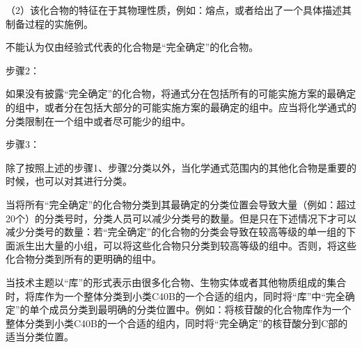 {\setlength{\parindent}{17.1bp}（2）该化合物的特征在于其物理性质，例如：熔点，或者给出了一个具体描述其制备过程的实施例。\par}

不能认为仅由经验式代表的化合物是“完全确定”的化合物。

{\kaiti 步骤2：}

如果没有披露“完全确定”的化合物，将通式分在包括所有的可能实施方案的最确定的组中，或者分在包括大部分的可能实施方案的最确定的组中。应当将化学通式的分类限制在一个组中或者尽可能少的组中。

{\kaiti 步骤3：}

除了按照上述的步骤1、步骤2分类以外，当化学通式范围内的其他化合物是重要的时候，也可以对其进行分类。

当将所有“完全确定”的化合物分类到其最确定的分类位置会导致大量（例如：超过20个）的分类号时，分类人员可以减少分类号的数量。但是只在下述情况下才可以减少分类号的数量：若“完全确定”的化合物的分类会导致在较高等级的单一组的下面派生出大量的小组，可以将这些化合物只分类到较高等级的组中。否则，将这些化合物分类到所有的更明确的组中。

当技术主题以“库”的形式表示由很多化合物、生物实体或者其他物质组成的集合时，将库作为一个整体分类到小类C40B的一个合适的组内，同时将“库”中“完全确定”的单个成员分类到最明确的分类位置中。例如：将核苷酸的化合物库作为一个整体分类到小类C40B的一个合适的组内，同时将“完全确定”的核苷酸分到C部的适当分类位置。

\stopparttoc
